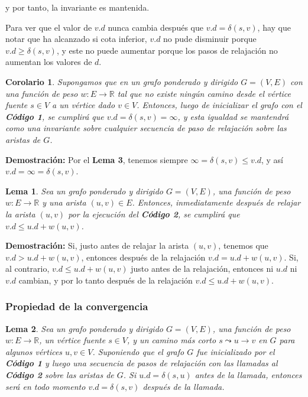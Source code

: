 \documentclass[12pt]{article}
\newcommand{\proof}{\textbf{Demostración:} }
\newcommand{\nl}{\vspace{0.3cm}}
\newtheorem{lemma}{Lema}
\newtheorem{corollary}{Corolario}
\begin{document}
y por tanto, la invariante es mantenida.

\nl

Para ver que el valor de $v.d$ nunca cambia después que $v.d = \delta(s, v)$, hay que notar que ha alcanzado si cota inferior, $v.d$ no pude disminuir porque $v.d \geqslant \delta(s, v)$, y este no puede aumentar porque los pasos de relajación no aumentan los valores de $d$.

\begin{corollary}
	Supongamos que en un grafo ponderado y dirigido $G = (V, E)$ con una función de peso $w: E \rightarrow \mathbb{R}$ tal que no existe ningún camino desde el vértice fuente $s \in V$ a un vértice dado $v \in V$. Entonces, luego de inicializar el grafo con el \textbf{Código 1}, se cumplirá que $v.d = \delta(s,v) = \infty$, y esta igualdad se mantendrá como una invariante sobre cualquier secuencia de paso de relajación sobre las aristas de $G$.
\end{corollary}

\proof Por el \textbf{Lema 3}, tenemos siempre $\infty = \delta(s, v) \leqslant v.d$, y así $v.d = \infty = \delta(s, v)$.

\begin{lemma}
	Sea un grafo ponderado y dirigido $G = (V, E)$, una función de peso $w: E \rightarrow \mathbb{R}$ y una arista $(u, v) \in E$. Entonces, inmediatamente después de relajar la arista $(u, v)$ por la ejecución del \textbf{Código 2}, se cumplirá que $v.d \leqslant u.d + w(u, v)$.
\end{lemma}

\proof Si, justo antes de relajar la arista $(u, v)$, tenemos que $v.d > u.d + w(u, v)$, entonces después de la relajación $v.d = u.d + w(u, v)$. Si, al contrario, $v.d \leqslant u.d + w(u, v)$ justo antes de la relajación, entonces ni $u.d$ ni $v.d$ cambian, y por lo tanto después de la relajación $v.d \leqslant u.d + w(u, v)$.

\subsubsection{Propiedad de la convergencia}

\nl

\begin{lemma}
	Sea un grafo ponderado y dirigido $G = (V, E)$, una función de peso $w: E \rightarrow \mathbb{R}$, un vértice fuente $s \in V$, y un camino más corto $s \leadsto u \rightarrow v $ en $G$ para algunos vértices $u, v \in V$. Suponiendo que el grafo $G$ fue inicializado por el \textbf{Código 1} y luego una secuencia de pasos de relajación con las llamadas al \textbf{Código 2} sobre las aristas de $G$. Si $u.d = \delta(s, u)$ antes de la llamada, entonces será en todo momento $v.d = \delta(s, v)$ después de la llamada.
\end{lemma}
\end{document}
